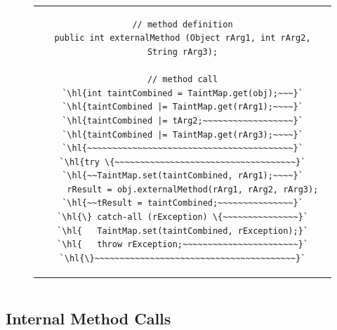 \documentclass[12pt,twoside,notitlepage]{report}
\begin{document}
\begin{figure}
	\centering
	\begin{tabular}{c}
	\begin{lstlisting}
// method definition
public int externalMethod (Object rArg1, int rArg2, String rArg3);

// method call
`\hl{int taintCombined = TaintMap.get(obj);~~~}`
`\hl{taintCombined |= TaintMap.get(rArg1);~~~~}`
`\hl{taintCombined |= tArg2;~~~~~~~~~~~~~~~~~~}`
`\hl{taintCombined |= TaintMap.get(rArg3);~~~~}`
`\hl{~~~~~~~~~~~~~~~~~~~~~~~~~~~~~~~~~~~~~~~~~}`
`\hl{try \{~~~~~~~~~~~~~~~~~~~~~~~~~~~~~~~~~~~~}`
`\hl{~~TaintMap.set(taintCombined, rArg1);~~~~}`
	rResult = obj.externalMethod(rArg1, rArg2, rArg3);
`\hl{~~tResult = taintCombined;~~~~~~~~~~~~~~~}`
`\hl{\} catch-all (rException) \{~~~~~~~~~~~~~~~}`
`\hl{	TaintMap.set(taintCombined, rException);}`
`\hl{	throw rException;~~~~~~~~~~~~~~~~~~~~~~~}`
`\hl{\}~~~~~~~~~~~~~~~~~~~~~~~~~~~~~~~~~~~~~~~~}`
	\end{lstlisting}
	\end{tabular}
	\begin{lstlisting}[caption={Instrumentation of external method calls. The second and third arguments do not inherit combined taint because they are immutable.},
	                   label={listing:TaintPropagation_ExternalMethodCall}]
	\end{lstlisting}
\end{figure}

\subsection{Internal Method Calls}
\label{section:TaintPropagation_MethodCalls_Internal}
\end{document}
